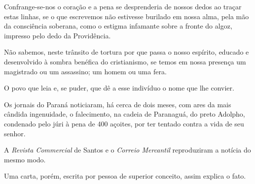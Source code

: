 Confrange-se-nos o coração e a pena se desprenderia de nossos dedos ao
traçar estas linhas, se o que escrevemos não estivesse burilado em nossa
alma, pela mão da consciência soberana, como o estigma infamante sobre a
fronte do algoz, impresso pelo dedo da Providência.

Não sabemos, neste trânsito de tortura por que passa o nosso espírito,
educado e desenvolvido à sombra benéfica do cristianismo, se temos em
nossa presença um magistrado ou um assassino; um homem ou uma fera.

O povo que leia e, se puder, que dê a esse indivíduo o nome que lhe
convier.

Os jornais do Paraná noticiaram, há cerca de dois meses, com ares da
mais cândida ingenuidade, o falecimento, na cadeia de Paranaguá, do
preto Adolpho, condenado pelo júri à pena de 400 açoites, por ter
tentado contra a vida de seu senhor.

A \emph{Revista Commercial} de Santos e o \emph{Correio Mercantil}
reproduziram a notícia do mesmo modo.

Uma carta, porém, escrita por pessoa de superior conceito, assim explica
o fato.

